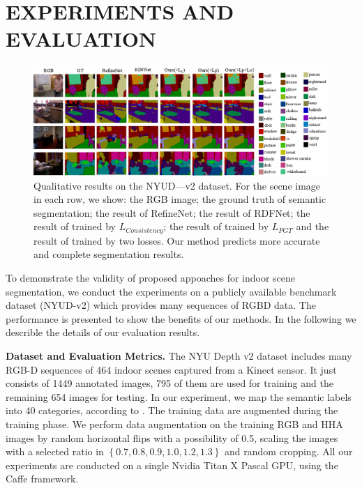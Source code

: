 \section{EXPERIMENTS AND EVALUATION}
\label{sec:exper}
\begin{figure}[!th]
	\centering
	\includegraphics[scale=0.6]{figure/Result.png}
	\caption{Qualitative results on the NYUD—v2 dataset. For the secne image in each row, we show: the RGB image; the ground truth of semantic segmentation; the result of RefineNet; the result of RDFNet; the result of trained by $L_{Consistency}$; the result of trained by $L_{PGT}$ and the result of trained by two losses. Our method predicts more accurate and complete segmentation results.}
	\label{fig:VisResult}
\end{figure}
To demonstrate the validity of proposed appoaches for indoor scene segmentation, we conduct the experiments on a publicly available benchmark dataset (NYUD-v2) which provides many sequences of RGBD data. 
%
The performance is presented to show the benefits of our methods.
%
In the following we describle the details of our evaluation results.


{\bf{Dataset and Evaluation Metrics.}} 
The NYU Depth v2 dataset includes many RGB-D sequences of 464 indoor scenes captured from a Kinect sensor. 
%
It just consists of 1449 annotated images, 795 of them are used for training and the remaining 654 images for testing.
%
In our experiment, we map the semantic labels into 40 categories, according to \cite{Gupta2014}.
%
The training data are augmented during the training phase. 
%
We perform data augmentation on the training RGB and HHA images by random horizontal flips with a possibility of 0.5, scaling the images with a selected ratio in $\left\{0.7,0.8,0.9,1.0,1.2,1.3\right\}$ and random cropping. 
%
All our experiments are conducted on a single Nvidia Titan X Pascal GPU, using the Caffe framework.


